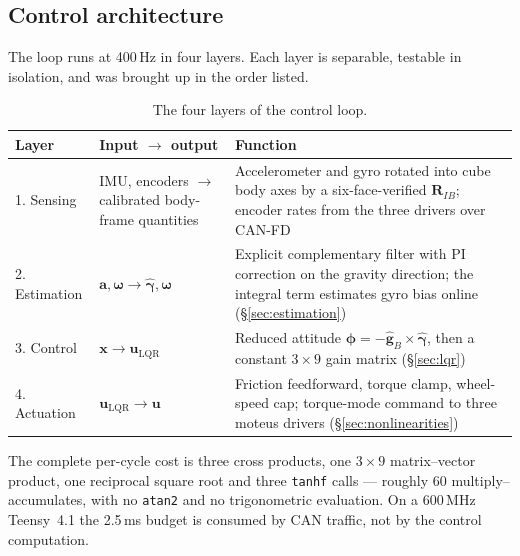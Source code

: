 \subsection{Control architecture}
\label{sec:control_architecture}

The loop runs at 400\,Hz in four layers. Each layer is separable, testable in
isolation, and was brought up in the order listed.

\begin{table}[htbp]
\centering
\small
\begin{tabular}{@{}llp{62mm}@{}}
\toprule
\textbf{Layer} & \textbf{Input $\rightarrow$ output} & \textbf{Function}\\
\midrule
1. Sensing &
  IMU, encoders $\rightarrow$ calibrated body-frame quantities &
  Accelerometer and gyro rotated into cube body axes by a
  six-face-verified $\bm{R}_{IB}$; encoder rates from the three drivers over
  CAN-FD\\[0.4em]
2. Estimation &
  $\bm{a},\bm{\omega} \rightarrow \hat{\bm{\gamma}},\bm{\omega}$ &
  Explicit complementary filter with PI correction on the gravity direction;
  the integral term estimates gyro bias online
  (\S\ref{sec:estimation})\\[0.4em]
3. Control &
  $\bm{x} \rightarrow \bm{u}_{\mathrm{LQR}}$ &
  Reduced attitude $\bm{\phi} = -\hat{\bm{g}}_B \times \hat{\bm{\gamma}}$,
  then a constant $3\times9$ gain matrix
  (\S\ref{sec:lqr})\\[0.4em]
4. Actuation &
  $\bm{u}_{\mathrm{LQR}} \rightarrow \bm{u}$ &
  Friction feedforward, torque clamp, wheel-speed cap; torque-mode command
  to three moteus drivers
  (\S\ref{sec:nonlinearities})\\
\bottomrule
\end{tabular}
\caption{The four layers of the control loop.}
\label{tab:architecture}
\end{table}

The complete per-cycle cost is three cross products, one $3\times9$
matrix--vector product, one reciprocal square root and three \texttt{tanhf}
calls --- roughly 60 multiply--accumulates, with no \texttt{atan2} and no
trigonometric evaluation. On a 600\,MHz Teensy~4.1 the 2.5\,ms budget is
consumed by CAN traffic, not by the control computation.


